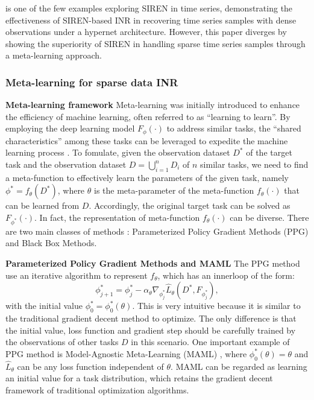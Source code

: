 \documentclass{article}
\begin{document}
\cite{fons2022hypertime} is one of the few examples exploring SIREN in time series, demonstrating the effectiveness of SIREN-based INR in recovering time series samples with dense observations under a hypernet architecture.
However, this paper diverges by showing the superiority of SIREN in handling sparse time series samples through a meta-learning approach.


\subsubsection{Meta-learning for sparse data INR}

\textbf{Meta-learning framework}
Meta-learning was initially introduced to enhance the efficiency of machine learning, often referred to as ``learning to learn''.
By employing the deep learning model $F_\phi(\cdot)$ to address similar tasks, the ``shared characteristics'' among these tasks can be leveraged to expedite the machine learning process \cite{raghu2019rapid}.
To fomulate, given the observation dataset $D^*$ of the target task and the observation dataset $D=\bigcup_{i=1}^n D_i$ of $n$ similar tasks, we need to find a meta-function to effectively learn the parameters of the given task, namely $\phi^*=f_\theta(D^*)$,
where $\theta$ is the meta-parameter of the meta-function $f_\theta(\cdot)$ that can be learned from $D$. Accordingly, the original target task can be solved as $F_{\phi^*}(\cdot)$.
In fact, the representation of meta-function $f_\theta(\cdot)$ can be diverse. There are two main classes of methods \cite{beck2023survey}:  Parameterized Policy Gradient Methods (PPG) and Black Box Methods.

\textbf{Parameterized Policy Gradient Methods and MAML}
The PPG method use an iterative algorithm to represent $f_\theta$, which has an innerloop of the form:
$$
\phi^*_{j+1}=\phi_j^*-\alpha_\theta \nabla_{\phi_j^*} \hat{L}_\theta\left(D^*, F_{\phi_j^*}\right),
$$
with the initial value $\phi_0^*=\phi_0^*(\theta)$.
This is very intuitive because it is similar to the traditional gradient decent method to optimize. 
The only difference is that the initial value, loss function and gradient step should be carefully trained by the observations of other tasks $D$ in this scenario.
One important example of PPG method is  Model-Agnostic Meta-Learning (MAML) \cite{finn2017model}, where $\phi_0^*(\theta)=\theta$ and $\hat{L}_\theta$ can be any loss function independent of $\theta$.
MAML can be regarded as learning an initial value for a task distribution, which retains the gradient decent framework of traditional optimization algorithms.
\end{document}
